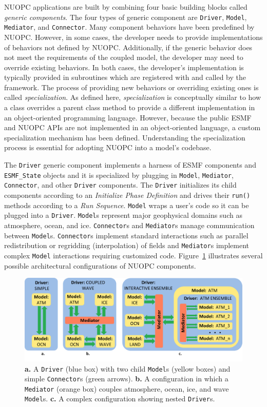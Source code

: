 \documentclass[oneside,11pt]{memoir}
\begin{document}
NUOPC applications are built by combining four basic building blocks called \emph{generic components}. The four types of generic component are \texttt{Driver}, \texttt{Model}, \texttt{Mediator}, and \texttt{Connector}. Many component behaviors have been predefined by NUOPC. However, in some cases, the developer needs to provide implementations of behaviors not defined by NUOPC. Additionally, if the generic behavior does not meet the requirements of the coupled model, the developer may need to override existing behaviors.  In both cases, the developer's implementation is typically provided in subroutines which are registered with and called by the framework. The process of providing new behaviors or overriding existing ones is called \emph{specialization}. As defined here, \emph{specialization} is conceptually similar to how a class overrides a parent class method to provide a different implementation in an object-oriented programming language. However, because the public ESMF and NUOPC APIs are not implemented in an object-oriented language, a custom specialization mechanism has been defined. Understanding the specialization process is essential for adopting NUOPC into a model's codebase.

The \texttt{Driver} generic component implements a harness of ESMF components and \texttt{ESMF\_State} objects and it is specialized by plugging in \texttt{Model}, \texttt{Mediator}, \texttt{Connector}, and other \texttt{Driver} components. The \texttt{Driver} initializes its child components according to an \emph{Initialize Phase Definition} and drives their \texttt{run()} methods according to a \emph{Run Sequence}. \texttt{Model} wraps a user's code so it can be plugged into a \texttt{Driver}. \texttt{Model}s represent major geophysical domains such as atmosphere, ocean, and ice. \texttt{Connector}s and \texttt{Mediator}s manage communication between \texttt{Model}s. \texttt{Connector}s implement standard interactions such as parallel redistribution or regridding (interpolation) of fields and \texttt{Mediator}s implement complex \texttt{Model} interactions requiring customized code. Figure~\ref{fig:nuopcarchs} illustrates several possible architectural configurations of NUOPC components.

\begin{figure}
	\centering
	 \includegraphics[width=\textwidth]{figs/nuopcarchs.png}
	\caption{\textbf{a.} A \texttt{Driver} (blue box) with two child \texttt{Model}s (yellow boxes) and simple \texttt{Connector}s (green arrows).  \textbf{b.} A configuration in which a \texttt{Mediator} (orange box) couples atmosphere, ocean, ice, and wave \texttt{Model}s.  \textbf{c.} A complex configuration showing nested \texttt{Driver}s.}
	\label{fig:nuopcarchs}
\end{figure}
\end{document}
